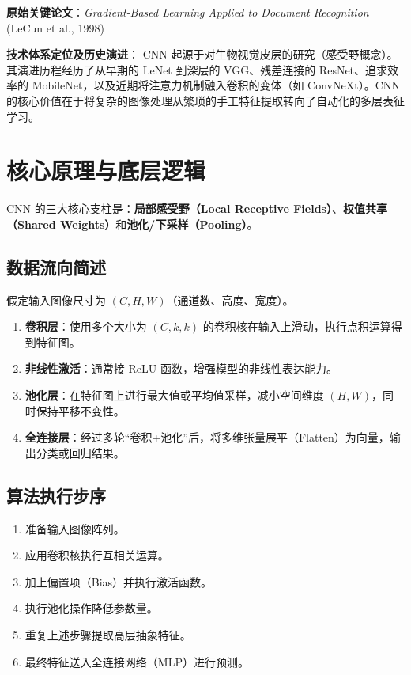 \documentclass[12pt, a4paper]{book}
\begin{document}
\textbf{原始关键论文}：\textit{Gradient-Based Learning Applied to Document Recognition} (LeCun et al., 1998)

\textbf{技术体系定位及历史演进}：
CNN 起源于对生物视觉皮层的研究（感受野概念）。其演进历程经历了从早期的 LeNet 到深层的 VGG、残差连接的 ResNet、追求效率的 MobileNet，以及近期将注意力机制融入卷积的变体（如 ConvNeXt）。CNN 的核心价值在于将复杂的图像处理从繁琐的手工特征提取转向了自动化的多层表征学习。

\section{核心原理与底层逻辑}
CNN 的三大核心支柱是：\textbf{局部感受野（Local Receptive Fields）}、\textbf{权值共享（Shared Weights）}和\textbf{池化/下采样（Pooling）}。

\subsection{数据流向简述}
假定输入图像尺寸为 $(C, H, W)$（通道数、高度、宽度）。
\begin{enumerate}
    \item \textbf{卷积层}：使用多个大小为 $(C, k, k)$ 的卷积核在输入上滑动，执行点积运算得到特征图。
    \item \textbf{非线性激活}：通常接 ReLU 函数，增强模型的非线性表达能力。
    \item \textbf{池化层}：在特征图上进行最大值或平均值采样，减小空间维度 $(H, W)$，同时保持平移不变性。
    \item \textbf{全连接层}：经过多轮“卷积+池化”后，将多维张量展平（Flatten）为向量，输出分类或回归结果。
\end{enumerate}

\subsection{算法执行步序}
\begin{enumerate}
    \item 准备输入图像阵列。
    \item 应用卷积核执行互相关运算。
    \item 加上偏置项（Bias）并执行激活函数。
    \item 执行池化操作降低参数量。
    \item 重复上述步骤提取高层抽象特征。
    \item 最终特征送入全连接网络（MLP）进行预测。
\end{enumerate}
\end{document}
